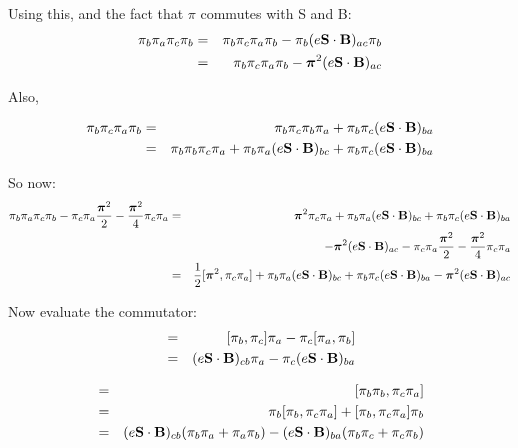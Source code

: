 Using this, and the fact that $\pi$ commutes with S and B:
\begin{eqnarray*}
\pi_b \pi_a \pi_c \pi_b 
	&=&	\pi_b \pi_c \pi_a \pi_b 
				- \pi_b (e \mathbf{S} \cdot \mathbf{B})_{ac} \pi_b \\
	&=&	\pi_b \pi_c \pi_a \pi_b 
				-\mbox{\boldmath$ \pi $}^2 (e \mathbf{S} \cdot \mathbf{B})_{ac}	\\
\end{eqnarray*}

Also,

\begin{eqnarray*}
\pi_b \pi_c \pi_a \pi_b 
	&=&	\pi_b \pi_c \pi_b \pi_a 
				+ \pi_b \pi_c (e \mathbf{S} \cdot \mathbf{B})_{ba}	\\
	&=&	\pi_b \pi_b \pi_c \pi_a 
				+ \pi_b \pi_a (e \mathbf{S} \cdot \mathbf{B})_{bc}
				+ \pi_b \pi_c (e \mathbf{S} \cdot \mathbf{B})_{ba}	\\
\end{eqnarray*}

So now:
\begin{eqnarray*}
\pi_b \pi_a \pi_c \pi_b  
	- \pi_c \pi_a \frac{\mbox{\boldmath$ \pi $}^2}{2} 
	- \frac{\mbox{\boldmath$ \pi $}^2}{4} \pi_c \pi_a
	&=&	\mbox{\boldmath$ \pi $}^2 \pi_c \pi_a 
				+ \pi_b \pi_a (e \mathbf{S} \cdot \mathbf{B})_{bc}
				+ \pi_b \pi_c (e \mathbf{S} \cdot \mathbf{B})_{ba} \\
	&&			-\mbox{\boldmath$ \pi $}^2 (e \mathbf{S} \cdot \mathbf{B})_{ac}
				- \pi_c \pi_a \frac{\mbox{\boldmath$ \pi $}^2}{2} 
				- \frac{\mbox{\boldmath$ \pi $}^2}{4} \pi_c \pi_a	\\
	&=&	\frac{1}{2} [\mbox{\boldmath$ \pi $}^2, \pi_c \pi_a]
				+ \pi_b \pi_a (e \mathbf{S} \cdot \mathbf{B})_{bc}
				+ \pi_b \pi_c (e \mathbf{S} \cdot \mathbf{B})_{ba}
				-\mbox{\boldmath$ \pi $}^2 (e \mathbf{S} \cdot \mathbf{B})_{ac} \\
\end{eqnarray*}

Now evaluate the commutator:
\begin{eqnarray*}
[\pi_b, \pi_c \pi_a]
	&=&	[\pi_b, \pi_c]\pi_a - \pi_c [\pi_a, \pi_b]	\\
	&=&	(e \v{S} \cdot \v{B})_{cb} \pi_a
				- \pi_c (e \v{S} \cdot \v{B})_{ba}	\\
\end{eqnarray*}

\begin{eqnarray*}
[ \gv{\pi}^2, \pi_c \pi_a]
	&=&	[\pi_b \pi_b, \pi_c \pi_a]	\\
	&=&	\pi_b [\pi_b, \pi_c \pi_a] + [\pi_b, \pi_c \pi_a] \pi_b	\\
	&=&	(e \v{S} \cdot \v{B})_{cb} ( \pi_b \pi_a + \pi_a \pi_b)
				-  (e \v{S} \cdot \v{B})_{ba} (\pi_b \pi_c + \pi_c \pi_b)	\\
\end{eqnarray*}



